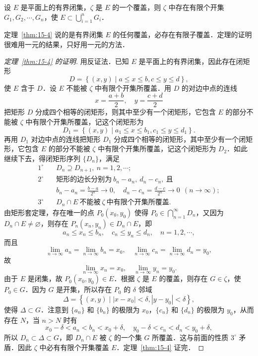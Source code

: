 \begin{theorem}[博雷尔有限覆盖定理]\label{thm:15-4}
设 $E$ 是平面上的有界闭集，$\zeta$ 是 $E$ 的一个覆盖，则 $\zeta$ 中存在有限个开集 $G_{1},G_{2},\cdots,G_{n}$，使 $E\subset\bigcup\limits_{i=1}^{n}G_{i}$．
\end{theorem}

定理~\ref{thm:15-4} 说的是有界闭集 $E$ 的任何覆盖，必存在有限子覆盖．定理的证明很难用一元的结果，只好用一元的方法．

\begin{proof}[定理~\ref{thm:15-4} 的证明]
用反证法．已知 $E$ 是平面上的有界闭集，因此存在闭矩形
\[
D=\left\{(x,y)\mid a\leqslant x\leqslant b,c\leqslant y\leqslant d\right\},
\]
使 $E$ 含于 $D$．设 $E$ 不能被 $\zeta$ 中有限个开集所覆盖．用 $D$ 的对边中点的连线
\[
x=\frac{a+b}{2},\quad y=\frac{c+d}{2}
\]
把矩形 $D$ 分成四个相等的闭矩形，则其中至少有一个闭矩形，它包含 $E$ 的部分不能被 $\zeta$ 中有限个开集所覆盖，记这个闭矩形为
\[
D_{1}=\left\{(x,y)\mid a_{1}\leqslant x\leqslant b_{1},c_{1}\leqslant y\leqslant d_{1}\right\}.
\]
再用 $D_{1}$ 对边中点的连线把矩形 $D_{1}$ 分成四个相等的闭矩形，其中至少有一个闭矩形，它包含 $E$ 的部分不能被 $\zeta$ 中有限个开集所覆盖，记这个闭矩形为 $D_{2}$．如此继续下去，得闭矩形序列 $\{D_{n}\}$，满足
\[
\begin{aligned}
1^{\circ}\quad & D_{n}\supseteq D_{n+1},\ n=1,2,\cdots;\\
2^{\circ}\quad & \text{矩形的边长分别为}\ b_{n}-a_{n},\ d_{n}-c_{n},\ \text{且}\\
& b_{n}-a_{n}=\frac{b-a}{2^{n}}\to 0,\quad d_{n}-c_{n}=\frac{d-c}{2^{n}}\to 0\ \ (n\to\infty);\\
3^{\circ}\quad & D_{n}\cap E\ \text{不能被}\ \zeta\ \text{中有限个开集所覆盖}.
\end{aligned}
\]
由矩形套定理，存在唯一的点 $P_{0}(x_{0},y_{0})$ 使得 $P_{0}\in\bigcap\limits_{n=1}^{\infty}D_{n}$，又因为 $D_{n}\cap E\neq\varnothing$，则存在 $P_{n}(x_{n},y_{n})\in D_{n}\cap E$，即
\[
a_{n}\leqslant x_{n}\leqslant b_{n},\quad c_{n}\leqslant y_{n}\leqslant d_{n},\quad n=1,2,\cdots,
\]
而且
\[
\lim_{n\to\infty}a_{n}=\lim_{n\to\infty}b_{n}=x_{0},\quad \lim_{n\to\infty}c_{n}=\lim_{n\to\infty}d_{n}=y_{0},
\]
故
\[
\lim_{n\to\infty}x_{n}=x_{0},\quad\lim_{n\to\infty}y_{n}=y_{0}.
\]
由于 $E$ 是闭集，故 $P_{0}(x_{0},y_{0})\in E$．根据 $\zeta$ 是 $E$ 的覆盖，则存在 $G\in\zeta$，使 $P_{0}\in G$．因为 $G$ 是开集，所以存在 $P_{0}$ 的 $\delta$ 邻域
\[
\Delta=\left\{(x,y)\mid \left|x-x_{0}\right|<\delta,\left|y-y_{0}\right|<\delta\right\},
\]
使得 $\Delta\subset G$．注意到 $\{a_{n}\}$ 和 $\{b_{n}\}$ 的极限为 $x_{0}$，$\{c_{n}\}$ 和 $\{d_{n}\}$ 的极限为 $y_{0}$，从而存在 $N$，当 $n>N$ 时有
\[
x_{0}-\delta<a_{n}<b_{n}<x_{0}+\delta,\quad y_{0}-\delta<c_{n}<d_{n}<y_{0}+\delta,
\]
所以 $D_{n}\subset\Delta\subset G$，即 $D_{n}\cap E$ 被 $\zeta$ 的一个集 $G$ 所覆盖．这与前面的性质 $3^{\circ}$ 矛盾．因此 $\zeta$ 中必有有限个开集覆盖 $E$．定理~\ref{thm:15-4} 证完．
\end{proof}

